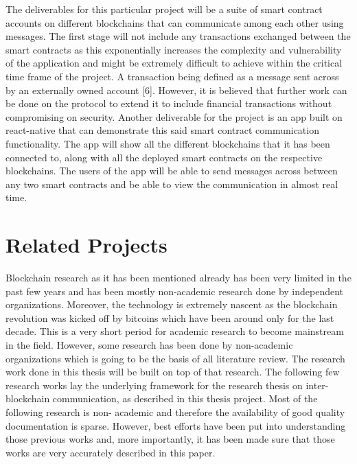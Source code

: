\documentclass[a4paper,twoside,phd]{BYUPhys}
\begin{document}
The deliverables for this particular project will be a suite of smart contract accounts on different blockchains that can communicate among each other using messages. The first stage will not include any transactions exchanged between the smart contracts as this exponentially increases the complexity and vulnerability of the application and might be extremely difficult to achieve within the critical time frame of the project. A transaction being defined as a message sent across by an externally owned account [6]. However, it is believed that further work can be done on the protocol to extend it to include financial transactions without compromising on security. Another deliverable for the project is an app built on react-native that can demonstrate this said smart contract communication functionality. The app will show all the different blockchains that it has been connected to, along with all the deployed smart contracts on the respective blockchains. The users of the app will be able to send messages across between any two smart contracts and be able to view the communication in almost real time.

\label{chap:LitReview}



\section{Related Projects \label{sec:CapResultsReview}}
Blockchain research as it has been mentioned already has been very limited in the past few years and has been mostly non-academic research done by independent organizations. Moreover, the technology is extremely nascent as the blockchain revolution was kicked off by bitcoins which have been around only for the last decade. This is a very short period for academic research to become mainstream in the field. However, some research has been done by non-academic organizations which is going to be the basis of all literature review. The research work done in this thesis will be built on top of that research. The following few research works lay the underlying framework for the research thesis on inter-blockchain communication, as described in this thesis project. Most of the following research is non- academic and therefore the availability of good quality documentation is sparse. However, best efforts have been put into understanding those previous works and, more importantly, it has been made sure that those works are very accurately described in this paper.
\end{document}
